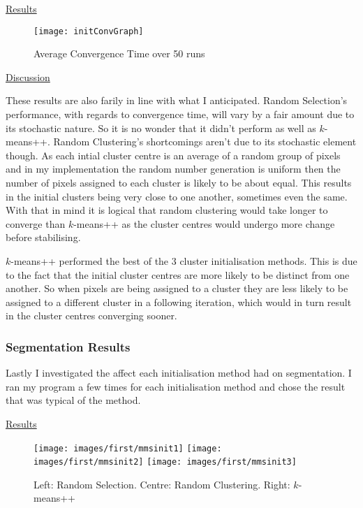 \documentclass{article}
\begin{document}
\underline{Results}

\begin{figure}[H]
\begin{center}
\texttt{[image: initConvGraph]}
\caption{Average Convergence Time over 50 runs}
\end{center}
\end{figure}

\underline{Discussion}

These results are also farily in line with what I anticipated. Random Selection's performance, with regards to convergence time, will vary by a fair amount due to its stochastic nature. So it is no wonder that it didn't perform as well as $k$-means++. Random Clustering's shortcomings aren't due to its stochastic element though. As each intial cluster centre is an average of a random group of pixels and in my implementation the random number generation is uniform then the number of pixels assigned to each cluster is likely to be about equal. This results in the initial clusters being very close to one another, sometimes even the same. With that in mind it is logical that random clustering would take longer to converge than $k$-means++ as the cluster centres would undergo more change before stabilising.

$k$-means++ performed the best of the 3 cluster initialisation methods. This is due to the fact that the initial cluster centres are more likely to be distinct from one another. So when pixels are being assigned to a cluster they are less likely to be assigned to a different cluster in a following iteration, which would in turn result in the cluster centres converging sooner. 


\subsubsection{Segmentation Results}

Lastly I investigated the affect each initialisation method had on segmentation. I ran my program a few times for each initialisation method and chose the result that was typical of the method. 


\underline{Results}

\begin{figure}[H]
\begin{center}
\texttt{[image: images/first/mmsinit1]}
\texttt{[image: images/first/mmsinit2]}
\texttt{[image: images/first/mmsinit3]}
\caption{Left: Random Selection. Centre: Random Clustering. Right: $k$-means++ }
\end{center}
\end{figure}
\end{document}
